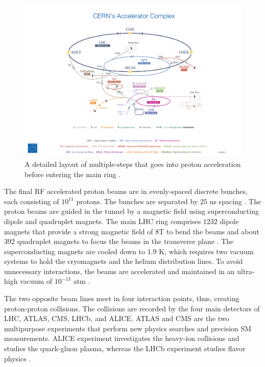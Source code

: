 \begin{figure}
    \centering
    \includegraphics[width=.98\linewidth]{figures/LHC/ProtonAccelerator.jpeg}
    \caption{ A detailed layout of multiple-steps that goes into proton acceleration before entering the main ring \cite{ProtonAcclerator}.\label{fig:ProtonAcc}}
\end{figure}

The final RF accelerated proton beams are in evenly-spaced discrete bunches, each consisting of $10^{11}$ protons. The bunches are separated by $25$ ns spacing \cite{LHCGuide}. The proton beams are guided in the tunnel by a magnetic field using superconducting dipole and quadruplet magnets. The main LHC ring comprises $1232$ dipole magnets that provide a strong magnetic field of $8$T to bend the beams and about $392$ quadruplet magnets to focus the beams in the transverse plane \cite{LHCGuide}. The superconducting magnets are cooled down to $1.9$ K, which requires two vacuum systems to hold the cryomagnets and the helium distribution lines. To avoid unnecessary interactions, the beams are accelerated and maintained in an ultra-high vacuum of $10^{-13}$ atm \cite{LHCGuide}. 

The two opposite beam lines meet in four interaction points, thus, creating proton-proton collisions. The collisions are recorded by the four main detectors of LHC, ATLAS, CMS, LHCb, and ALICE. ATLAS and CMS are the two multipurpose experiments that perform new physics searches and precision SM measurements. ALICE experiment investigates the heavy-ion collisions and studies the quark-gluon plasma, whereas the LHCb experiment studies flavor physics \cite{LHCGuide}.
